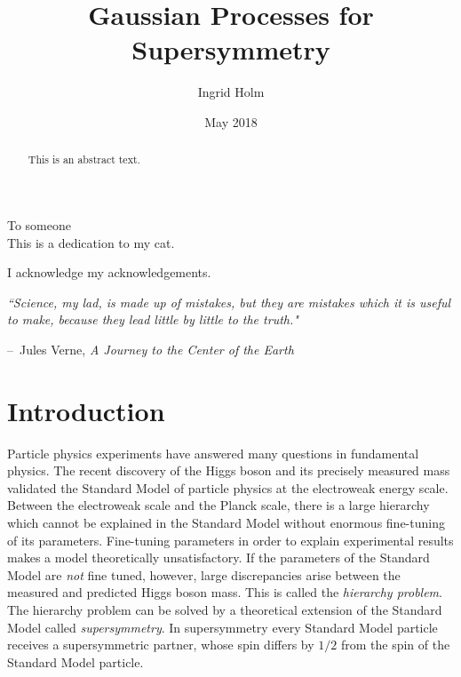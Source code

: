 \documentclass[twoside,english]{uiofysmaster}
\makeatletter
\newenvironment{chapquote}[2][2em]
  {\setlength{\@tempdima}{#1}%
   \def\chapquote@author{#2}%
   \parshape 1 \@tempdima \dimexpr\textwidth-2\@tempdima\relax%
   \itshape}
  {\par\normalfont\hfill--\ \chapquote@author\hspace*{\@tempdima}\par\bigskip}
\makeatother
\begin{document}
\title{Gaussian Processes for Supersymmetry}
\author{Ingrid Holm}
\date{May 2018}

\maketitle

\begin{abstract}
This is an abstract text.
\end{abstract}

\begin{dedication}
  To someone
  \\\vspace{12pt}
  This is a dedication to my cat.
\end{dedication}

\begin{acknowledgements}
  I acknowledge my acknowledgements.
\end{acknowledgements}

\tableofcontents


\begin{dedication}
\begin{chapquote}{Jules Verne, \textit{A Journey to the Center of the Earth}}
``Science, my lad, is made up of mistakes, but they are mistakes which it is useful to make, because they lead little by little to the truth."
\end{chapquote}
\end{dedication}

\chapter*{Introduction}





Particle physics experiments have answered many questions in fundamental physics. The recent discovery of the Higgs boson and its precisely measured mass validated the Standard Model of particle physics at the electroweak energy scale. Between the electroweak scale and the Planck scale, there is a large hierarchy which cannot be explained in the Standard Model without enormous fine-tuning of its parameters. Fine-tuning parameters in order to explain experimental results makes a model theoretically unsatisfactory. If the parameters of the Standard Model are \textit{not} fine tuned, however, large discrepancies arise between the measured and predicted Higgs boson mass. This is called the \textit{hierarchy problem}. The hierarchy problem can be solved by a theoretical extension of the Standard Model called \textit{supersymmetry}. In supersymmetry every Standard Model particle receives a supersymmetric partner, whose spin differs by $1/2$ from the spin of the Standard Model particle. 
\end{document}
